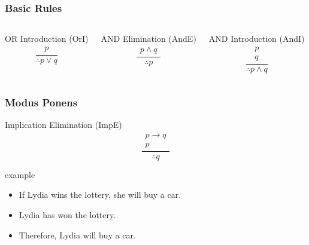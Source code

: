 \documentclass[dvipsnames]{beamer}
\begin{document}
\begin{frame}
  \frametitle{Basic Rules}

  \begin{columns}[t]
    \begin{block}{OR Introduction (OrI)}
      \[
      \frac
        {
          \begin{array}{c}
            p
          \end{array}
        }
        {
          \therefore p \vee q
        }
      \]
    \end{block}

    \pause
    \begin{block}{AND Elimination (AndE)}
    \[
    \frac
      {
        \begin{array}{c}
          p \wedge q
        \end{array}
      }
      {
        \therefore p
      }
    \]
    \end{block}

    \pause
    \begin{block}{AND Introduction (AndI)}
      \[
      \frac
        {
          \begin{array}{c}
            p\\
            q
          \end{array}
        }
        {
          \therefore p \wedge q
        }
      \]
    \end{block}
  \end{columns}
\end{frame}

\begin{frame}
  \frametitle{Modus Ponens}

  \begin{block}{Implication Elimination (ImpE)}
    \[
    \frac
      {
        \begin{array}{c}
          p \rightarrow q\\
          p
        \end{array}
      }
      {
        \therefore q
      }
    \]
  \end{block}

  \pause
  \begin{exampleblock}{example}
    \begin{itemize}
      \item If Lydia wins the lottery, she will buy a car.
      \item Lydia has won the lottery.

      \medskip
      \item Therefore, Lydia will buy a car.
    \end{itemize}
  \end{exampleblock}
\end{frame}
\end{document}
